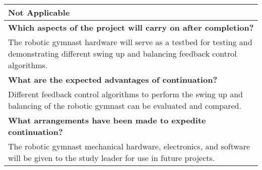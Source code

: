 \begin{titlingpage}
\begin{table}[!h]
\begin{tabular}{|P{15cm}|}
		\hline 
		Not Applicable \\
		\hline 
		\textbf{Which aspects of the project will carry on after completion?} \\
		\hline
		The robotic gymnast hardware will serve as a testbed for testing and demonstrating different swing up and balancing feedback control algorithms. \\
		\hline 
		\textbf{What are the expected advantages of continuation?} \\
		\hline 
		 Different feedback control algorithms to perform the swing up and balancing of the robotic gymnast can be evaluated and compared. \\
		\hline 
		\textbf{What arrangements have been made to expedite continuation?} \\
		\hline 
		The robotic gymnast mechanical hardware, electronics, and software will be given to the study leader for use in future projects. \\
		\hline
		
		
		
		
		
	\end{tabular}
\end{table}
\end{titlingpage}